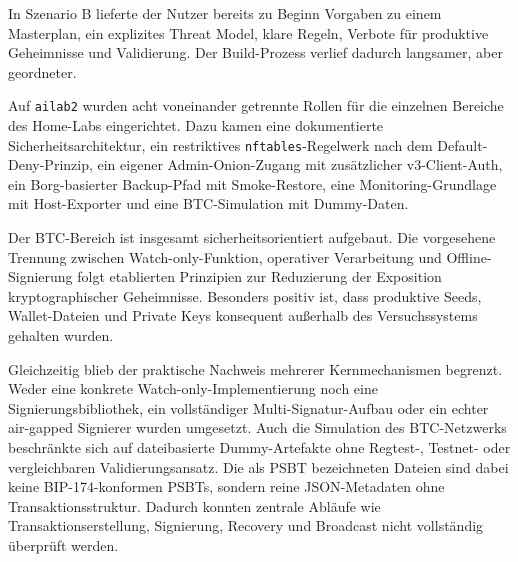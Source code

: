 In Szenario B lieferte der Nutzer bereits zu Beginn Vorgaben zu einem Masterplan, ein explizites Threat Model, klare Regeln, Verbote für produktive Geheimnisse und Validierung. Der Build-Prozess verlief dadurch langsamer, aber geordneter.

Auf \texttt{ailab2} wurden acht voneinander getrennte Rollen für die einzelnen Bereiche des Home-Labs eingerichtet. Dazu kamen eine dokumentierte Sicherheitsarchitektur, ein restriktives \texttt{nftables}-Regelwerk nach dem Default-Deny-Prinzip, ein eigener Admin-Onion-Zugang mit zusätzlicher v3-Client-Auth, ein Borg-basierter Backup-Pfad mit Smoke-Restore, eine Monitoring-Grundlage mit Host-Exporter und eine \ac{BTC}-Simulation mit Dummy-Daten.

Der \ac{BTC}-Bereich ist insgesamt sicherheitsorientiert aufgebaut. Die vorgesehene Trennung zwischen Watch-only-Funktion, operativer Verarbeitung und Offline-Signierung folgt etablierten Prinzipien zur Reduzierung der Exposition kryptographischer Geheimnisse. 
Besonders positiv ist, dass produktive Seeds, Wallet-Dateien und Private Keys konsequent außerhalb des Versuchssystems gehalten wurden. 

Gleichzeitig blieb der praktische Nachweis mehrerer Kernmechanismen begrenzt. Weder eine konkrete Watch-only-Implementierung noch eine Signierungsbibliothek, ein vollständiger Multi-Signatur-Aufbau oder ein echter air-gapped Signierer wurden umgesetzt.
Auch die Simulation des \ac{BTC}-Netzwerks beschränkte sich auf dateibasierte Dummy-Artefakte ohne Regtest-, Testnet- oder vergleichbaren Validierungsansatz. Die als \ac{PSBT} bezeichneten Dateien sind dabei keine \ac{BIP}-174-konformen \acp{PSBT}, sondern reine \ac{
JSON}-Metadaten ohne Transaktionsstruktur.
Dadurch konnten zentrale Abläufe wie Transaktionserstellung, Signierung, Recovery und Broadcast nicht vollständig überprüft werden. 

